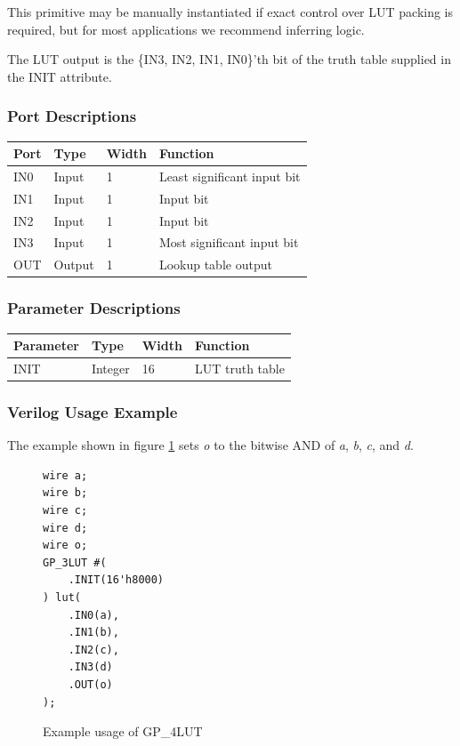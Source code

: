 \documentclass[11pt]{article}
\begin{document}
This primitive may be manually instantiated if exact control over LUT packing is required, but for most applications we 
recommend inferring logic.

The LUT output is the \{IN3, IN2, IN1, IN0\}'th bit of the truth table supplied in the INIT attribute.

\subsubsection{Port Descriptions}

\begin{tabularx}{4in}{|l|l|l|X|}
\hline
{\bfseries Port} & {\bfseries Type} & {\bfseries Width} & {\bfseries Function} \\
\hline
IN0 & Input & 1 & Least significant input bit \\
\hline
IN1 & Input & 1 & Input bit \\
\hline
IN2 & Input & 1 & Input bit \\
\hline
IN3 & Input & 1 & Most significant input bit \\
\hline
OUT & Output & 1 & Lookup table output \\
\hline
\end{tabularx}

\subsubsection{Parameter Descriptions}

\begin{tabularx}{4in}{|l|l|l|X|}
\hline
{\bfseries Parameter} & {\bfseries Type} & {\bfseries Width} & {\bfseries Function} \\
\hline
INIT & Integer & 16 & LUT truth table \\
\hline
\end{tabularx}

\subsubsection{Verilog Usage Example}

The example shown in figure \ref{gp-4LUT-example} sets \emph{o} to the bitwise AND of \emph{a}, \emph{b}, \emph{c},
and \emph{d}.

\begin{figure}[h]
\begin{lstlisting}
wire a;
wire b;
wire c;
wire d;
wire o;
GP_3LUT #(
	.INIT(16'h8000)
) lut(
	.IN0(a),
	.IN1(b),
	.IN2(c),
	.IN3(d)
	.OUT(o)
);
\end{lstlisting}
\caption{Example usage of GP\_4LUT}
\label{gp-4LUT-example}
\end{figure}
\end{document}
